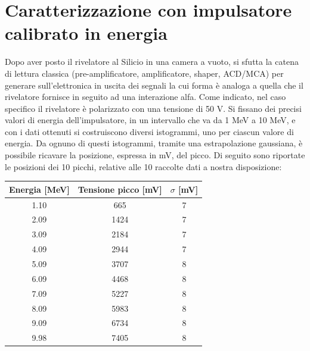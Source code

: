 \documentclass[a4paper,10pt]{article}
\begin{document}
\section{Caratterizzazione con impulsatore calibrato in energia}
Dopo aver posto il rivelatore al Silicio in una camera a vuoto, si sfutta la catena di lettura classica (pre-amplificatore, amplificatore, shaper, ACD/MCA) per generare sull'elettronica in uscita dei segnali la cui forma \`e analoga a quella che il rivelatore fornisce in seguito ad una interazione alfa. Come indicato, nel caso specifico il rivelatore \`e polarizzato con una tensione di 50 V. Si fissano dei precisi valori di energia dell'impulsatore, in un intervallo che va da 1 MeV a 10 MeV, e con i dati ottenuti si costruiscono diversi istogrammi, uno per ciascun valore di energia. Da ognuno di questi istogrammi, tramite una estrapolazione gaussiana, \`e possibile ricavare la posizione, espressa in mV, del picco. Di seguito sono riportate le posizioni dei 10 picchi, relative alle 10 raccolte dati a nostra disposizione:
\begin{center}
    \begin{tabular}{ccc}
        \toprule
        Energia [MeV] & Tensione picco [mV] & $\sigma$ [mV]\\
        \midrule
        1.10 & 665 & 7\\
        2.09 & 1424 & 7\\
        3.09 & 2184 & 7\\
        4.09 & 2944 & 7\\
        5.09 & 3707 & 8\\
        6.09 & 4468 & 8\\
        7.09 & 5227 & 8\\
        8.09 & 5983 & 8\\
        9.09 & 6734 & 8\\
        9.98 & 7405 & 8\\
        \bottomrule
    \end{tabular}\\
\end{center}
\end{document}
